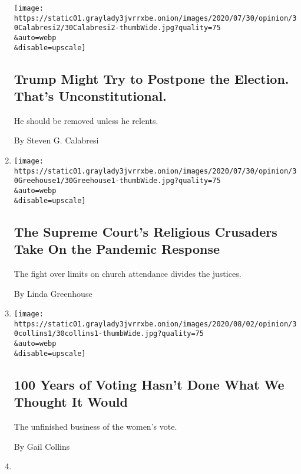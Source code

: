 \begin{enumerate}
  \texttt{[image: https://static01.graylady3jvrrxbe.onion/images/2020/07/30/opinion/30Calabresi2/30Calabresi2-thumbWide.jpg?quality=75\\\&auto=webp\\\&disable=upscale]}

  \hypertarget{trump-might-try-to-postpone-the-election-thats-unconstitutional}{%
  \subsection{Trump Might Try to Postpone the Election. That's
  Unconstitutional.}\label{trump-might-try-to-postpone-the-election-thats-unconstitutional}}

  He should be removed unless he relents.

  By Steven G. Calabresi
\item
  \href{/2020/07/30/opinion/supreme-court-religion-coronavirus.html}{}

  \texttt{[image: https://static01.graylady3jvrrxbe.onion/images/2020/07/30/opinion/30Greehouse1/30Greehouse1-thumbWide.jpg?quality=75\\\&auto=webp\\\&disable=upscale]}

  \hypertarget{the-supreme-courts-religious-crusaders-take-on-the-pandemic-response}{%
  \subsection{The Supreme Court's Religious Crusaders Take On the
  Pandemic
  Response}\label{the-supreme-courts-religious-crusaders-take-on-the-pandemic-response}}

  The fight over limits on church attendance divides the justices.

  By Linda Greenhouse
\item
  \href{/2020/07/30/opinion/sunday/19th-amendment-women-suffrage.html}{}

  \texttt{[image: https://static01.graylady3jvrrxbe.onion/images/2020/08/02/opinion/30collins1/30collins1-thumbWide.jpg?quality=75\\\&auto=webp\\\&disable=upscale]}

  \hypertarget{100-years-of-voting-hasnt-done-what-we-thought-it-would}{%
  \subsection{100 Years of Voting Hasn't Done What We Thought It
  Would}\label{100-years-of-voting-hasnt-done-what-we-thought-it-would}}

  The unfinished business of the women's vote.

  By Gail Collins
\item
  \href{/2020/07/30/opinion/the-argument-authoritarianism-anne-applebaum.html}{}


\end{enumerate}
